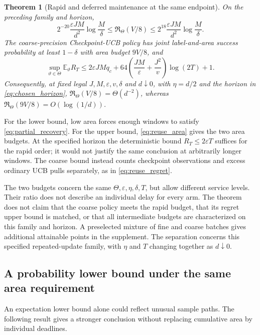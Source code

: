 \documentclass[11pt]{article}
\newtheorem{theorem}{Theorem}[section]
\theoremstyle{remark}
\newcommand{\E}{\mathbb E}
\begin{document}
\begin{theorem}[Rapid and deferred maintenance at the same endpoint]
\label{thm:tradeoff}
On the preceding family and horizon,
\begin{equation}
 2^{-20}\frac{\varepsilon JM}{d^2}\log\frac M\delta
 \le\mathfrak R_\Theta(V/8)\le
 2^{18}\frac{\varepsilon JM}{d^2}\log\frac M\delta.
 \label{eq:rapid_matched}
\end{equation}
The coarse-precision Checkpoint-UCB policy has joint label-and-area success
probability at least $1-\delta$ with area budget $9V/8$, and
\begin{equation}
 \sup_{\vartheta\in\Theta}\E_\vartheta R_T\le
 2\varepsilon JM q_c+
 64\left(\frac{JM}{\varepsilon}+\frac{J^2}{v}\right)\log(2T)+1.
 \label{eq:coarse_regret}
\end{equation}
Consequently, at fixed legal $J,M,\varepsilon,v,\delta$ and $d\downarrow0$,
with $\eta=d/2$ and the horizon in \eqref{eq:chosen_horizon},
$\mathfrak R_\Theta(V/8)=\Theta(d^{-2})$, whereas
$\mathfrak R_\Theta(9V/8)=O(\log(1/d))$.
\end{theorem}

For the lower bound, low area forces enough windows to satisfy
\eqref{eq:partial_recovery}. For the upper bound, \eqref{eq:reuse_area}
gives the two area budgets. At the specified horizon the deterministic bound
$R_T\le2\varepsilon T$ suffices for the rapid order; it would not justify
the same conclusion at arbitrarily longer windows. The coarse bound instead
counts checkpoint observations and excess ordinary UCB pulls separately,
as in \eqref{eq:reuse_regret}.

The two budgets concern the same $\Theta,\varepsilon,\eta,\delta,T$, but
allow different service levels. Their ratio does not describe an individual
delay for every arm. The theorem does not claim that the coarse policy meets
the rapid budget, that its regret upper bound is matched, or that all
intermediate budgets are characterized on this family and horizon. A preselected mixture of fine and
coarse batches gives additional attainable points in the supplement. The
separation concerns this specified repeated-update family, with $\eta$ and
$T$ changing together as $d\downarrow0$.

\subsection{A probability lower bound under the same area requirement}

An expectation lower bound alone could reflect unusual sample paths. The
following result gives a stronger conclusion without replacing cumulative
area by individual deadlines.
\end{document}
